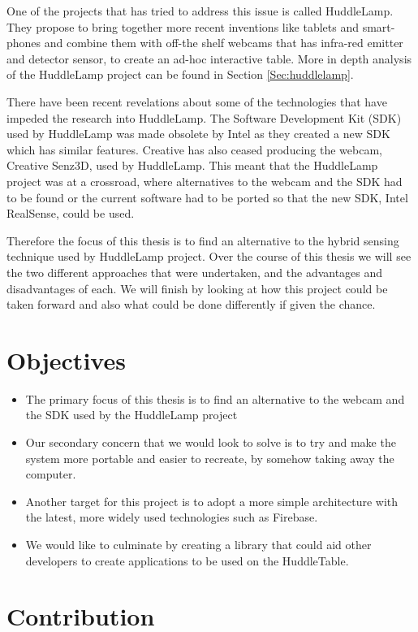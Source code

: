 One of the projects that has tried to address this issue is called HuddleLamp\cite{huddlelamp-paper}. They propose to bring together more recent inventions like tablets and smart-phones and combine them with off-the shelf webcams that has infra-red emitter and detector sensor, to create an ad-hoc interactive table. More in depth analysis of the HuddleLamp project can be found in Section \ref{Sec:huddlelamp}.

There have been recent revelations about some of the technologies that have impeded the research into HuddleLamp. The Software Development Kit (SDK) used by HuddleLamp was made obsolete by Intel as they created a new SDK which has similar features. Creative has also ceased producing the webcam, Creative Senz3D, used by HuddleLamp. This meant that the HuddleLamp project was at a crossroad, where alternatives to the webcam and the SDK had to be found or the current software had to be ported so that the new SDK, Intel RealSense\cite{intel-realsense}, could be used.

Therefore the focus of this thesis is to find an alternative to the hybrid sensing technique used by HuddleLamp project. Over the course of this thesis we will see the two different approaches that were undertaken, and the advantages and disadvantages of each. We will finish by looking at how this project could be taken forward and also what could be done differently if given the chance.


\section{Objectives}

\begin{itemize}
\item The primary focus of this thesis is to find an alternative to the webcam and the SDK used by the HuddleLamp project
\item Our secondary concern that we would look to solve is to try and make the system more portable and easier to recreate, by somehow taking away the computer.
\item Another target for this project is to adopt a more simple architecture with the latest, more widely used technologies such as Firebase.
\item We would like to culminate by creating a library that could aid other developers to create applications to be used on the HuddleTable.
\end{itemize}

\section{Contribution}

